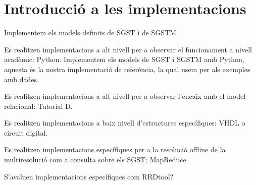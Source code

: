 

\chapter{Introducció a les implementacions}


Implementem els models definits de \gls{SGST} i de \gls{SGSTM}


Es realitzen implementacions a alt nivell per a observar el funcionament a nivell acadèmic: Python. Implementem els models de \gls{SGST} i \gls{SGSTM} amb Python, aquesta és la nostra implementació de referència, la qual usem per als exemples amb dades.

Es realitzen implementacions a alt nivell per a observar l'encaix amb el model relacional: Tutorial D.

Es realitzen implementacions a baix nivell d'estructures específiques: VHDL o circuit digital.


Es realitzen implementacions específiques per a la resolució offline de la multiresolució com a consulta sobre els \gls{SGST}: MapReduce


S'avaluen implementacions específiques com RRDtool?













